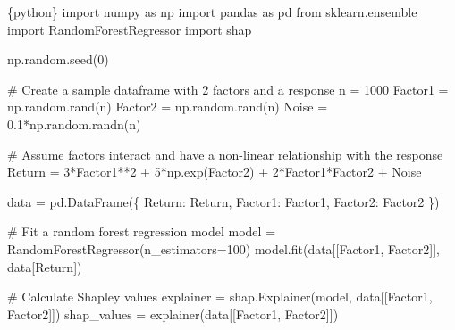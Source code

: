 \documentclass[
  letterpaper,
  DIV=11,
  numbers=noendperiod]{scrartcl}
\newenvironment{Shaded}{\begin{snugshade}}{\end{snugshade}}
\newcommand{\CommentTok}[1]{\textcolor[rgb]{0.37,0.37,0.37}{#1}}
\newcommand{\DecValTok}[1]{\textcolor[rgb]{0.68,0.00,0.00}{#1}}
\newcommand{\FloatTok}[1]{\textcolor[rgb]{0.68,0.00,0.00}{#1}}
\newcommand{\ImportTok}[1]{\textcolor[rgb]{0.00,0.46,0.62}{#1}}
\newcommand{\InformationTok}[1]{\textcolor[rgb]{0.37,0.37,0.37}{#1}}
\newcommand{\NormalTok}[1]{\textcolor[rgb]{0.00,0.23,0.31}{#1}}
\newcommand{\OperatorTok}[1]{\textcolor[rgb]{0.37,0.37,0.37}{#1}}
\newcommand{\StringTok}[1]{\textcolor[rgb]{0.13,0.47,0.30}{#1}}
\begin{document}
\begin{Shaded}
\begin{Highlighting}[]
\InformationTok{\textasciigrave{}\textasciigrave{}\textasciigrave{}\{python\}}
\ImportTok{import}\NormalTok{ numpy }\ImportTok{as}\NormalTok{ np}
\ImportTok{import}\NormalTok{ pandas }\ImportTok{as}\NormalTok{ pd}
\ImportTok{from}\NormalTok{ sklearn.ensemble }\ImportTok{import}\NormalTok{ RandomForestRegressor}
\ImportTok{import}\NormalTok{ shap}

\NormalTok{np.random.seed(}\DecValTok{0}\NormalTok{)}

\CommentTok{\# Create a sample dataframe with 2 factors and a response}
\NormalTok{n }\OperatorTok{=} \DecValTok{1000}
\NormalTok{Factor1 }\OperatorTok{=}\NormalTok{ np.random.rand(n)}
\NormalTok{Factor2 }\OperatorTok{=}\NormalTok{ np.random.rand(n)}
\NormalTok{Noise }\OperatorTok{=} \FloatTok{0.1}\OperatorTok{*}\NormalTok{np.random.randn(n)}

\CommentTok{\# Assume factors interact and have a non{-}linear relationship with the response}
\NormalTok{Return }\OperatorTok{=} \DecValTok{3}\OperatorTok{*}\NormalTok{Factor1}\OperatorTok{**}\DecValTok{2} \OperatorTok{+} \DecValTok{5}\OperatorTok{*}\NormalTok{np.exp(Factor2) }\OperatorTok{+} \DecValTok{2}\OperatorTok{*}\NormalTok{Factor1}\OperatorTok{*}\NormalTok{Factor2 }\OperatorTok{+}\NormalTok{ Noise}

\NormalTok{data }\OperatorTok{=}\NormalTok{ pd.DataFrame(\{}
    \StringTok{\textquotesingle{}Return\textquotesingle{}}\NormalTok{: Return,}
    \StringTok{\textquotesingle{}Factor1\textquotesingle{}}\NormalTok{: Factor1,}
    \StringTok{\textquotesingle{}Factor2\textquotesingle{}}\NormalTok{: Factor2}
\NormalTok{\})}

\CommentTok{\# Fit a random forest regression model}
\NormalTok{model }\OperatorTok{=}\NormalTok{ RandomForestRegressor(n\_estimators}\OperatorTok{=}\DecValTok{100}\NormalTok{)}
\NormalTok{model.fit(data[[}\StringTok{\textquotesingle{}Factor1\textquotesingle{}}\NormalTok{, }\StringTok{\textquotesingle{}Factor2\textquotesingle{}}\NormalTok{]], data[}\StringTok{\textquotesingle{}Return\textquotesingle{}}\NormalTok{])}

\CommentTok{\# Calculate Shapley values}
\NormalTok{explainer }\OperatorTok{=}\NormalTok{ shap.Explainer(model, data[[}\StringTok{\textquotesingle{}Factor1\textquotesingle{}}\NormalTok{, }\StringTok{\textquotesingle{}Factor2\textquotesingle{}}\NormalTok{]])}
\NormalTok{shap\_values }\OperatorTok{=}\NormalTok{ explainer(data[[}\StringTok{\textquotesingle{}Factor1\textquotesingle{}}\NormalTok{, }\StringTok{\textquotesingle{}Factor2\textquotesingle{}}\NormalTok{]])}


\end{Highlighting}
\end{Shaded}
\end{document}
